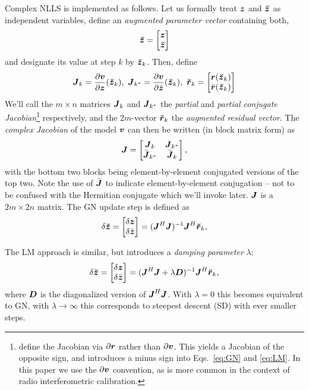 \documentclass[useAMS,usenatbib]{mn2e}
\makeatletter
\newcommand{\zz}{\bmath{z}}
\newcommand{\zzc}{\bmath{\bar z}}
\newcommand{\rr}{\bmath{r}}
\newcommand{\vv}{\bmath{v}}
\newcommand{\mat}[1]{{\bmath{#1}}}
\newcommand{\JJ}{\mat{J}} %
\newcommand{\DD}{\mat{D}}
\newcommand{\Matrix}[2]{\left [ \begin{array}{@{}#1@{}}#2\end{array} \right ]}
\newcommand{\AUG}[1]{\bmath{\breve{#1}}}
\newcommand{\Zz}{\AUG{z}}
\newcommand{\Rr}{\AUG{r}}
\numberwithin{equation}{section}
\makeatother
\begin{document}
Complex NLLS is implemented as follows. Let us formally treat $\zz$ and $\zzc$ as independent variables, 
define an {\em augmented parameter vector} containing both,
\begin{equation}
\Zz = \Matrix{c}{\zz \\ \zzc}
\end{equation}
and designate its value at step $k$ by $\Zz_k$. Then, define
\begin{equation}
\label{eq:Jkrk}
\JJ_k=\frac{\partial \vv}{\partial \zz} (\Zz_k), ~\JJ_{k^*}=\frac{\partial \vv}{\partial \bar{\zz}}(\Zz_k),~
\Rr_k=\Matrix{c}{\rr(\Zz_k)\\\bar{\rr}(\Zz_k)}
\end{equation}
We'll call the $m\times n$ matrices $\JJ_k$ and $\JJ_{k^*}$ the \emph{partial} and \emph{partial conjugate 
Jacobian}\footnote{\citet{ComplexOpt} define the Jacobian via $\partial\rr$ rather than
$\partial\vv$. This yields a Jacobian of the opposite sign, and introduces a minus sign into 
Eqs.~\ref{eq:GN} and \ref{eq:LM}. In this paper we use the $\partial\vv$ convention, as is more common in the
context of radio interferometric calibration.}
respectively, 
and the $2m$-vector $\Rr_k$ the \emph{augmented residual vector}. The \emph{complex Jacobian} 
of the model $\vv$ can then be written (in block matrix form) as
\begin{equation}
\label{eq:JJ}
\JJ = \Matrix{cc}{\JJ_k & \JJ_{k^*} \\ \bar{\JJ}_{k^*} & \bar{\JJ}_{k} },
\end{equation}
with the bottom two blocks being element-by-element conjugated versions of the top two. Note the use of $\bar{\JJ}$ to
indicate element-by-element conjugation -- not to be confused with the Hermitian conjugate which we'll invoke later. 
$\JJ$ is a $2m \times 2n$ matrix. The GN update step is defined as
\begin{equation}
\label{eq:GN}
\delta\Zz = \Matrix{c}{\delta \zz \\ \delta \bar{\zz}} = (\JJ^H \JJ)^{-1}\JJ^H \Rr_k,
\end{equation}

The LM approach is similar, but introduces a {\em damping parameter} $\lambda$:
\begin{equation}
\label{eq:LM}
\delta\Zz = \Matrix{c}{\delta \zz \\ \delta \bar{\zz}} = (\JJ^H \JJ + \lambda\DD)^{-1}\JJ^H \Rr_k,
\end{equation}
where $\DD$ is the diagonalized version of $\JJ^H\JJ$. With $\lambda=0$ this becomes equivalent to GN,
with $\lambda\to\infty$ this corresponds to steepest descent (SD) with ever smaller steps.
\end{document}
